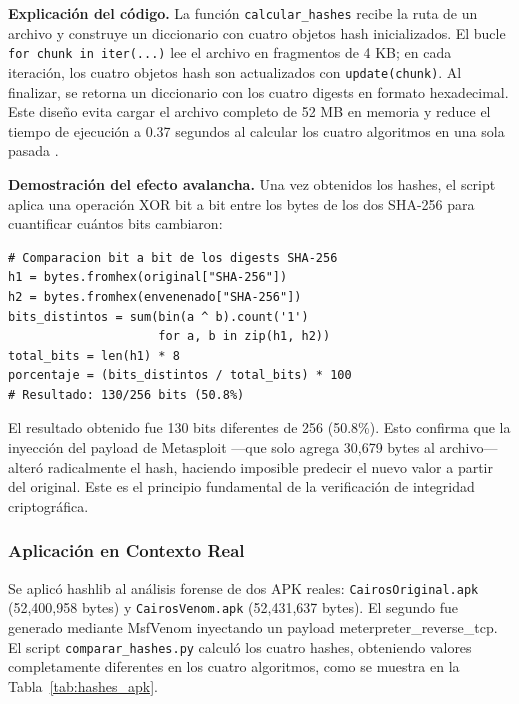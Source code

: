 \documentclass[12pt,a4paper]{article}
\begin{document}
\textbf{Explicación del código.} La función \texttt{calcular\_hashes}
recibe la ruta de un archivo y construye un diccionario con cuatro
objetos hash inicializados. El bucle \texttt{for chunk in iter(...)}
lee el archivo en fragmentos de 4 KB; en cada iteración, los cuatro
objetos hash son actualizados con \texttt{update(chunk)}. Al finalizar,
se retorna un diccionario con los cuatro digests en formato hexadecimal.
Este diseño evita cargar el archivo completo de 52 MB en memoria y
reduce el tiempo de ejecución a 0.37 segundos al calcular los cuatro
algoritmos en una sola pasada \cite{huacac2026}.

\textbf{Demostración del efecto avalancha.} Una vez obtenidos los
hashes, el script aplica una operación XOR bit a bit entre los bytes
de los dos SHA-256 para cuantificar cuántos bits cambiaron:

\begin{lstlisting}[caption={Cálculo del efecto avalancha con XOR sobre SHA-256},
                   label=lst:avalancha]
# Comparacion bit a bit de los digests SHA-256
h1 = bytes.fromhex(original["SHA-256"])
h2 = bytes.fromhex(envenenado["SHA-256"])
bits_distintos = sum(bin(a ^ b).count('1')
                     for a, b in zip(h1, h2))
total_bits = len(h1) * 8
porcentaje = (bits_distintos / total_bits) * 100
# Resultado: 130/256 bits (50.8%)
\end{lstlisting}

El resultado obtenido fue 130 bits diferentes de 256 (50.8\%). Esto
confirma que la inyección del payload de Metasploit —que solo agrega
30,679 bytes al archivo— alteró radicalmente el hash, haciendo imposible
predecir el nuevo valor a partir del original. Este es el principio
fundamental de la verificación de integridad criptográfica.

\subsubsection{Aplicación en Contexto Real}

Se aplicó hashlib al análisis forense de dos APK reales:
\texttt{CairosOriginal.apk} (52,400,958 bytes) y
\texttt{CairosVenom.apk} (52,431,637 bytes). El segundo fue generado
mediante MsfVenom inyectando un payload meterpreter\_reverse\_tcp. El
script \texttt{comparar\_hashes.py} calculó los cuatro hashes, obteniendo
valores completamente diferentes en los cuatro algoritmos, como se
muestra en la Tabla~\ref{tab:hashes_apk}.
\end{document}
